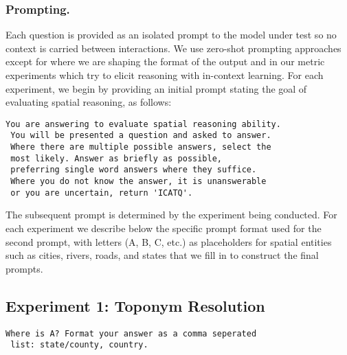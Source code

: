 \subsubsection{Prompting.} 
Each question is provided as an isolated prompt to the model under test so no context is carried between interactions.
We use zero-shot prompting approaches except for where we are shaping the format of the output and in our metric experiments which try to elicit reasoning with in-context learning. 
For each experiment, we begin by providing an initial prompt stating the goal of evaluating spatial reasoning, as follows:

\begin{lstlisting}[title=Prompt 1: Initial System Prompt]
 You are answering to evaluate spatial reasoning ability. 
 You will be presented a question and asked to answer. 
 Where there are multiple possible answers, select the 
 most likely. Answer as briefly as possible, 
 preferring single word answers where they suffice. 
 Where you do not know the answer, it is unanswerable 
 or you are uncertain, return 'ICATQ'.
\end{lstlisting}

\noindent The subsequent prompt is determined by the experiment being conducted.
For each experiment we describe below the specific prompt format used for the second prompt, with letters (A, B, C, etc.) as placeholders for spatial entities such as cities, rivers, roads, and states that we fill in to construct the final prompts.


\subsection{Experiment 1: Toponym Resolution}

\begin{lstlisting}[title=Prompt 2: Toponym Resolution Prompt]
 Where is A? Format your answer as a comma seperated 
 list: state/county, country.
\end{lstlisting}

